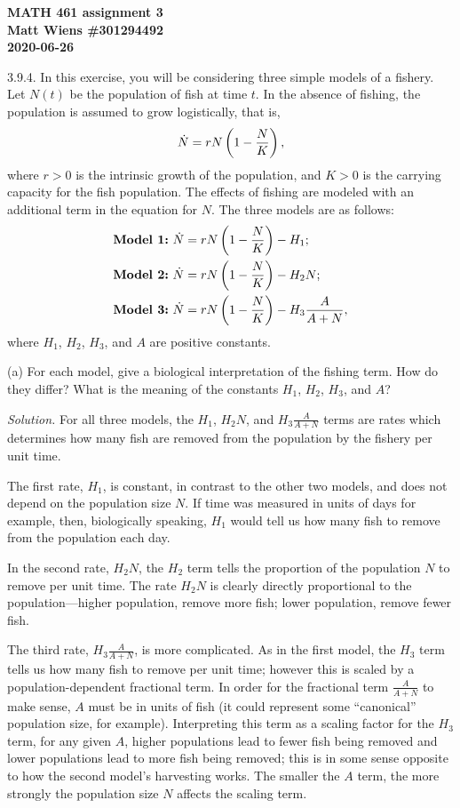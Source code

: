 \documentclass{article}
\begin{document}
\textbf{MATH 461 assignment 3} \\
\textbf{Matt Wiens \#301294492} \\
\textbf{2020-06-26}

3.9.4. In this exercise, you will be considering three simple models of
a fishery. Let $N(t)$ be the population of fish at time $t$. In the
absence of fishing, the population is assumed to grow logistically,
that is,
%
\begin{equation*}
    \dot N = r N \del{1 - \frac{N}{K}}
    ,
\end{equation*}
%
where $r > 0$ is the intrinsic growth of the population, and $K >0$ is
the carrying capacity for the fish population. The effects of fishing
are modeled with an additional term in the equation for $N$. The three
models are as follows:
%
\begin{align*}
    \text{\textbf{Model 1:}} \ \dot N &= r N \del{1 - \frac{N}{K}} - H_1; \\
    \text{\textbf{Model 2:}} \ \dot N &= r N \del{1 - \frac{N}{K}} - H_2 N; \\
    \text{\textbf{Model 3:}} \ \dot N &= r N \del{1 - \frac{N}{K}} - H_3 \frac{A}{A + N},
\end{align*}
%
where $H_1$, $H_2$, $H_3$, and $A$ are positive constants.

(a) For each model, give a biological interpretation of the fishing
term. How do they differ? What is the meaning of the constants $H_1$,
$H_2$, $H_3$, and $A$?

\textit{Solution.}
For all three models, the $H_1$, $H_2 N$, and $H_3 \frac{A}{A + N}$
terms are rates which determines how many fish are removed from the
population by the fishery per unit time.

The first rate, $H_1$, is constant, in contrast to the other two models,
and does not depend on the population size $N$. If time was measured in
units of days for example, then, biologically speaking, $H_1$ would tell
us how many fish to remove from the population each day.

In the second rate, $H_2 N$, the $H_2$ term tells the proportion of the
population $N$ to remove per unit time. The rate $H_2 N$ is clearly
directly proportional to the population---higher population, remove more
fish; lower population, remove fewer fish.

The third rate, $H_3 \frac{A}{A + N}$, is more complicated. As in the
first model, the $H_3$ term tells us how many fish to remove per unit
time; however this is scaled by a population-dependent fractional term.
In order for the fractional term $\frac{A}{A + N}$ to make sense, $A$
must be in units of fish (it could represent some ``canonical''
population size, for example). Interpreting this term as a scaling
factor for the $H_3$ term, for any given $A$, higher populations lead to
fewer fish being removed and lower populations lead to more fish being
removed; this is in some sense opposite to how the second model's
harvesting works. The smaller the $A$ term, the more strongly the
population size $N$ affects the scaling term.
\end{document}
